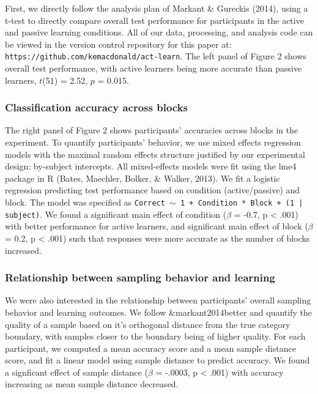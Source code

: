 \documentclass[10pt, letterpaper]{article}
\begin{document}
First, we directly follow the analysis plan of Markant \& Gureckis
(2014), using a t-test to directly compare overall test performance for
participants in the active and passive learning conditions. All of our
data, processing, and analysis code can be viewed in the version control
repository for this paper at:
\texttt{https://github.com/kemacdonald/act-learn}. The left panel of
Figure 2 shows overall test performance, with active learners being more
accurate than passive learners, \(t\)(51) = 2.52, \(p\) = 0.015.

\subsubsection{Classification accuracy across
blocks}\label{classification-accuracy-across-blocks}

The right panel of Figure 2 shows participants' accuracies across blocks
in the experiment. To quantify participants' behavior, we use mixed
effects regression models with the maximal random effects structure
justified by our experimental design: by-subject intercepts. All
mixed-effects models were fit using the lme4 package in R (Bates,
Maechler, Bolker, \& Walker, 2013). We fit a logistic regression
predicting test performance based on condition (active/passive) and
block. The model was specified as
\texttt{Correct $\sim$ 1 + Condition * Block + (1 | subject)}. We found
a significant main effect of condition (\(\beta\) = -0.7, p \textless{}
.001) with better performance for active learners, and significant main
effect of block (\(\beta\) = 0.2, p \textless{} .001) such that
responses were more accurate as the number of blocks increased.

\subsubsection{Relationship between sampling behavior and
learning}\label{relationship-between-sampling-behavior-and-learning}

We were also interested in the relationship between participants'
overall sampling behavior and learning outcomes. We follow
\&markant2014better and quantify the quality of a sample based on it's
orthogonal distance from the true category boundary, with samples closer
to the boundary being of higher quality. For each participant, we
computed a mean accuracy score and a mean sample distance score, and fit
a linear model using sample distance to predict accuracy. We found a
signficant effect of sample distance (\(\beta\) = -.0003, p \textless{}
.001) with accuracy increasing as mean sample distance decreased.
\end{document}
